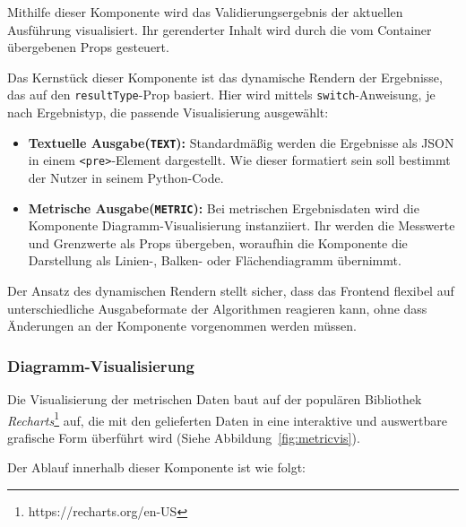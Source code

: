 Mithilfe dieser Komponente wird das Validierungsergebnis der aktuellen Ausführung visualisiert. Ihr gerenderter Inhalt wird durch die vom Container übergebenen Props gesteuert.

Das Kernstück dieser Komponente ist das dynamische Rendern der Ergebnisse, das auf den \texttt{resultType}-Prop basiert. Hier wird mittels \texttt{switch}-Anweisung, je nach Ergebnistyp, die passende Visualisierung ausgewählt:

\begin{itemize}
  \item \textbf{Textuelle Ausgabe(\texttt{TEXT}):} Standardmäßig werden die Ergebnisse als JSON in einem \texttt{<pre>}-Element dargestellt. Wie dieser formatiert sein soll bestimmt der Nutzer in seinem Python-Code.
  \item \textbf{Metrische Ausgabe(\texttt{METRIC}):} Bei metrischen Ergebnisdaten wird die Komponente Diagramm-Visualisierung instanziiert. Ihr werden die Messwerte und Grenzwerte als Props übergeben, woraufhin die Komponente die Darstellung als Linien-, Balken- oder Flächendiagramm übernimmt.
\end{itemize}

Der Ansatz des dynamischen Rendern stellt sicher, dass das Frontend flexibel auf unterschiedliche Ausgabeformate der Algorithmen reagieren kann, ohne dass Änderungen an der Komponente vorgenommen werden müssen.

\subsubsection*{Diagramm-Visualisierung}

Die Visualisierung der metrischen Daten baut auf der populären Bibliothek \textit{Recharts}\footnote{https://recharts.org/en-US} auf, die mit den gelieferten Daten in eine interaktive und auswertbare grafische Form überführt wird (Siehe Abbildung~\ref{fig:metricvis}).

Der Ablauf innerhalb dieser Komponente ist wie folgt:

